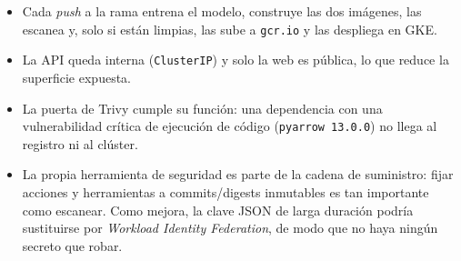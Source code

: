 \documentclass[11pt,a4paper]{article}
\newcommand{\code}[1]{\texttt{#1}}
\begin{document}
\begin{itemize}[nosep]
  \item Cada \emph{push} a la rama entrena el modelo, construye las dos imágenes, las
    escanea y, solo si están limpias, las sube a \code{gcr.io} y las despliega en GKE.
  \item La API queda interna (\code{ClusterIP}) y solo la web es pública, lo que reduce
    la superficie expuesta.
  \item La puerta de Trivy cumple su función: una dependencia con una vulnerabilidad
    crítica de ejecución de código (\code{pyarrow 13.0.0}) no llega al registro ni al
    clúster.
  \item La propia herramienta de seguridad es parte de la cadena de suministro: fijar
    acciones y herramientas a commits/digests inmutables es tan importante como escanear.
    Como mejora, la clave JSON de larga duración podría sustituirse por
    \emph{Workload Identity Federation}, de modo que no haya ningún secreto que robar.
\end{itemize}
\end{document}
